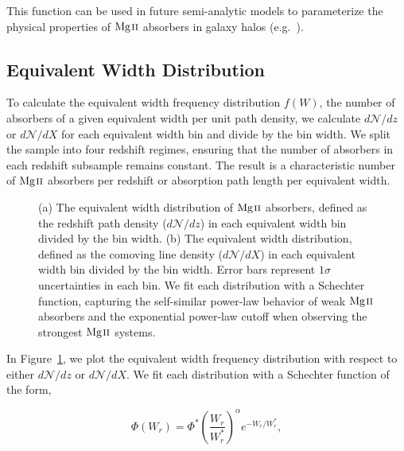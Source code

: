 \noindent This function can be used in future semi-analytic models to parameterize the physical properties of ${\hbox{{\rm Mg}\kern 0.1em{\sc ii}}}$ absorbers in galaxy halos (e.g.~\cite{Shattow2015}).

\subsection{Equivalent Width Distribution}
\label{ch5:ewdistro}


To calculate the equivalent width frequency distribution $f(W)$, the number of absorbers of a given equivalent width per unit path density, we calculate $d\mathcal{N}\!/dz$ or $d\mathcal{N}\!/dX$ for each equivalent width bin and divide by the bin width. We split the sample into four redshift regimes, ensuring that the number of absorbers in each redshift subsample remains constant. The result is a characteristic number of ${\hbox{{\rm Mg}\kern 0.1em{\sc ii}}}$ absorbers per redshift or absorption path length per equivalent width.

\begin{figure*}[bth]
\caption{(a) The equivalent width distribution of ${\hbox{{\rm Mg}\kern 0.1em{\sc ii}}}$ absorbers, defined as the redshift path density ($d\mathcal{N}\!/dz$) in each equivalent width bin divided by the bin width. (b) The equivalent width distribution, defined as the comoving line density ($d\mathcal{N}\!/dX$) in each equivalent width bin divided by the bin width. Error bars represent $1\sigma$ uncertainties in each bin. We fit each distribution with a Schechter function, capturing the self-similar power-law behavior of weak ${\hbox{{\rm Mg}\kern 0.1em{\sc ii}}}$ absorbers and the exponential power-law cutoff when observing the strongest ${\hbox{{\rm Mg}\kern 0.1em{\sc ii}}}$ systems.}
\label{fig:ewdistro}
\end{figure*}

In Figure~\ref{fig:ewdistro}, we plot the equivalent width frequency distribution with respect to either $d\mathcal{N}\!/dz$ or $d\mathcal{N}\!/dX$. We fit each distribution with a Schechter function of the form,

\begin{equation}
\Phi (W_r) = \Phi^* \left(\frac{W_r}{W_r^*}\right)^{\alpha} e^{-W_r / W_r^*} ,
\label{eqn:schechter}
\end{equation}

